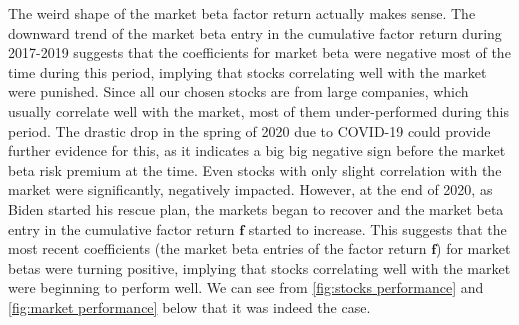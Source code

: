 \documentclass[13pt]{article}
\theoremstyle{definition}
\theoremstyle{remark}
\begin{document}
The weird shape of the market beta factor return actually makes sense. The downward trend of the market beta entry in the cumulative factor return during 2017-2019 suggests that the coefficients for market beta were negative most of the time during this period, implying that stocks correlating well with the market were punished. Since all our chosen stocks are from large companies, which usually correlate well with the market, most of them under-performed during this period. The drastic drop in the spring of 2020 due to COVID-19 could provide further evidence for this, as it indicates a big big negative sign before the market beta risk premium at the time. Even stocks with only slight correlation with the market were significantly, negatively impacted. However, at the end of 2020, as Biden started his rescue plan, the markets began to recover and the market beta entry in the cumulative factor return $\bm{f}$ started to increase. This suggests that the most recent coefficients (the market beta entries of the factor return $\bm{f}$) for market betas were turning positive, implying that stocks correlating well with the market were beginning to perform well. We can see from \cref{fig:stocks performance} and \cref{fig:market performance} below that it was indeed the case.
\end{document}
